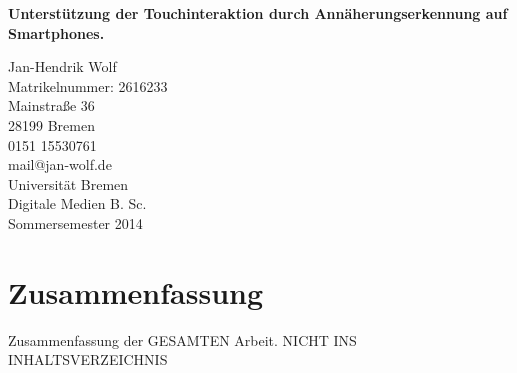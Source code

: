 \documentclass[a4paper,BCOR2mm,12pt,bibliography=totoc,listof=totoc,abstracton]{scrreprt}
\begin{document}
\begin{titlepage}
\begin{center}
\null
\vfill
\begin{Large}
\textsf{\textbf{Unterstützung der Touchinteraktion durch Annäherungserkennung auf Smartphones.}}
\end{Large}\linebreak \linebreak 
\begin{small}
\vfill{Jan-Hendrik Wolf \\ Matrikelnummer: 2616233 \\ Mainstraße 36 \\  28199 Bremen \\ 0151 15530761\\ mail@jan-wolf.de \\\vspace{3cm} Universität Bremen\\ Digitale Medien B. Sc. \\ Sommersemester 2014}
\null
\end{small}
\end{center}
\end{titlepage}

\tableofcontents
\thispagestyle{empty}

\pagestyle{plain}

\chapter*{Zusammenfassung}
Zusammenfassung der GESAMTEN Arbeit. NICHT INS INHALTSVERZEICHNIS
\end{document}
